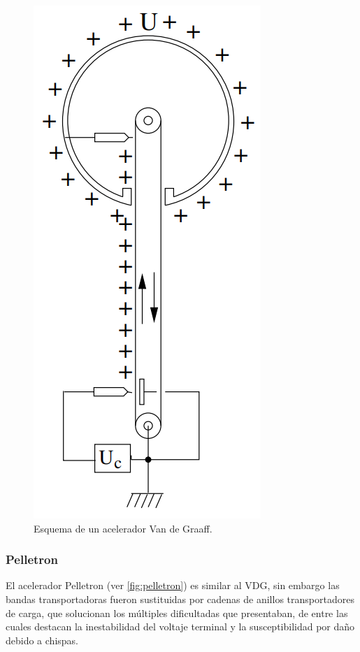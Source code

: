 \documentclass[12pt]{article}
\theoremstyle{break}
\theoremstyle{nonumberbreak}
\begin{document}
    \begin{figure}[htb]
        \centering
        \includegraphics[scale=0.5]{VDG}
        \caption{Esquema de un acelerador Van de Graaff.\cite{Hinterberger:1005042}}
        \label{fig:VDG}
    \end{figure}

    \subsubsection{Pelletron}

    El acelerador Pelletron (ver \cref{fig:pelletron}) es similar al VDG, sin embargo las bandas transportadoras fueron sustituidas por cadenas de anillos transportadores de carga, que solucionan los múltiples dificultadas que presentaban, de entre las cuales destacan la inestabilidad del voltaje terminal y la susceptibilidad por daño debido a chispas.\cite{herb1971pelletron}
\end{document}
